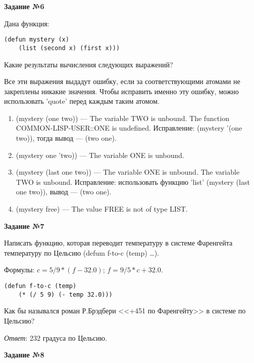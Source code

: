 \textbf{Задание №6}

Дана функция:
\begin{center}
    \captionsetup{justification=raggedright,singlelinecheck=off}
    \begin{lstlisting}[label=lst:task_2,caption=Код функции]
    (defun mystery (x) 
    (list (second x) (first x)))
\end{lstlisting}
\end{center}
Какие результаты вычисления следующих выражений?

Все эти выражения выдадут ошибку, если за соответствующими атомами не закреплены никакие значения. Чтобы исправить именно эту ошибку, можно использовать 'quote' перед каждым таким атомом.
\begin{enumerate}
    \item (mystery (one two)) --- The variable TWO is unbound. The function COMMON-LISP-USER::ONE is undefined. Исправление: (mystery '(one two)), тогда вывод --- (two one).
    \item (mystery one 'two)) --- The variable ONE is unbound. 
    \item (mystery (last one two)) --- The variable ONE is unbound. The variable TWO is unbound. Исправление: использовать функцию 'list' (mystery (last one two)), вывод --- (two one).
    \item (mystery free) --- The value FREE is not of type LIST.
\end{enumerate}

\textbf{Задание №7}

Написать функцию, которая переводит температуру в системе Фаренгейта
температуру по Цельсию (defum f-to-c (temp) …).

Формулы: $c = 5/9*(f-32.0)$; $f= 9/5*c+32.0$.
\begin{center}
    \captionsetup{justification=raggedright,singlelinecheck=off}
    \begin{lstlisting}[label=lst:task_2,caption=Код функции f-to-c]
    (defun f-to-c (temp)
    (* (/ 5 9) (- temp 32.0)))
\end{lstlisting}
\end{center}

Как бы назывался роман Р.Брэдбери <<+451 по Фаренгейту>> в системе по Цельсию?

\textit{Ответ}: 232 градуса по Цельсию.\newline

\textbf{Задание №8}

